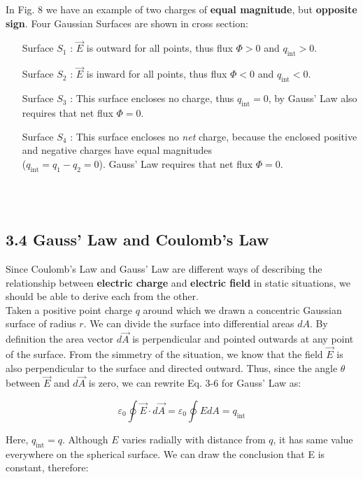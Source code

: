 \documentclass[12pt, a4paper]{article}
\begin{document}
		In Fig. 8 we have an example of two charges of \textbf{equal magnitude}, but \textbf{opposite sign}. Four Gaussian Surfaces are shown in cross section:
		\begin{itemize}
			\item[Surface $S_1$]: $\vec{E}$ is outward for all points, thus flux $\Phi > 0$ and $q_{\text{int}} > 0$.
			\item[Surface $S_2$]: $\vec{E}$ is inward for all points, thus flux $\Phi < 0$ and $q_{\text{int}} < 0$.
			\item[Surface $S_3$]: This surface encloses no charge, thus $q_{\text{int}} = 0$, by Gauss' Law also requires that net flux $\Phi = 0$.
			\item[Surface $S_4$]: This surface encloses no \textit{net} charge, because the enclosed positive and negative charges have equal magnitudes \\ 
			($q_{\text{int}} = q_1 - q_2 = 0$). Gauss' Law requires that net flux $\Phi = 0$.
		\end{itemize}
		\ \\ \\ 		
		
		\subsection*{3.4 Gauss' Law and Coulomb's Law}
		
		Since Coulomb's Law and Gauss' Law are different ways of describing the relationship between \textbf{electric charge} and \textbf{electric field} in static situations, we should be able to derive each from the other. \\
		Taken a positive point charge $q$ around which we drawn a concentric Gaussian surface of radius $r$. We can divide the surface into differential areas $dA$. By definition the area vector $d\vec{A}$ is perpendicular and pointed outwards at any point of the surface. From the simmetry of the situation, we know that the field $\vec{E}$ is also perpendicular to the surface and directed outward. Thus, since the angle $\theta$ between $\vec{E}$ and $d\vec{A}$ is zero, we can rewrite Eq. 3-6 for Gauss' Law as: 
		
		\begin{equation*}
			\varepsilon_0 \oint \vec{E} \cdot d\vec{A} =
			\varepsilon_0 \oint EdA = q_{\text{int}}
			\tag{3-7}
		\end{equation*}

		Here, $q_{\text{int}} = q$. Although $E$ varies radially with distance from $q$, it has same value everywhere on the spherical surface. We can draw the conclusion that E is constant, therefore:
		
\end{document}
